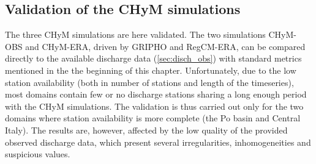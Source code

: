 \subsection{Validation of the CHyM simulations}
The three CHyM simulations are here validated.
The two simulations CHyM-OBS and CHyM-ERA, driven by GRIPHO and RegCM-ERA, can be compared directly to the available discharge data (\cref{sec:disch_obs}) with standard metrics mentioned in the the beginning of this chapter.
Unfortunately, due to the low station availability (both in number of stations and length of the timeseries), most domains contain few or no discharge stations sharing a long enough period with the CHyM simulations.
The validation is thus carried out only for the two domains where station availability is more complete (the Po basin and Central Italy).
The results are, however, affected by the low quality of the provided observed discharge data, which present several irregularities, inhomogeneities and suspicious values.

